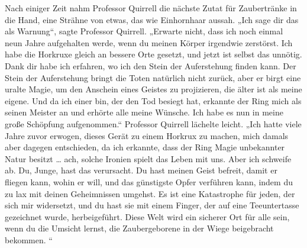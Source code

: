 Nach einiger Zeit nahm Professor Quirrell die nächste Zutat für Zaubertränke in die Hand, eine Strähne von etwas, das wie Einhornhaar aussah.
„Ich sage dir das als Warnung“, sagte Professor Quirrell.
„Erwarte nicht, dass ich noch einmal neun Jahre aufgehalten werde, wenn du meinen Körper irgendwie zerstörst. Ich habe die Horkruxe gleich an bessere Orte gesetzt, und jetzt ist selbst das unnötig. Dank dir habe ich erfahren, wo ich den Stein der Auferstehung finden kann. Der Stein der Auferstehung bringt die Toten natürlich nicht zurück, aber er birgt eine uralte Magie, um den Anschein eines Geistes zu projizieren, die älter ist als meine eigene. Und da ich einer bin, der den Tod besiegt hat, erkannte der Ring mich als seinen Meister an und erhörte alle meine Wünsche. Ich habe es nun in meine große Schöpfung aufgenommen.“
Professor Quirrell lächelte leicht.
„Ich hatte viele Jahre zuvor erwogen, dieses Gerät zu einem Horkrux zu machen, mich damals aber dagegen entschieden, da ich erkannte, dass der Ring Magie unbekannter Natur besitzt … ach, solche Ironien spielt das Leben mit uns. Aber ich schweife ab. Du, Junge, hast das verursacht. Du hast meinen Geist befreit, damit er fliegen kann, wohin er will, und das günstigste Opfer verführen kann, indem du zu lax mit deinen Geheimnissen umgehst. Es ist eine Katastrophe für jeden, der sich mir widersetzt, und du hast sie mit einem Finger, der auf eine Teeuntertasse gezeichnet wurde, herbeigeführt. Diese Welt wird ein sicherer Ort für alle sein, wenn du die Umsicht lernst, die Zaubergeborene in der Wiege beigebracht bekommen. “

